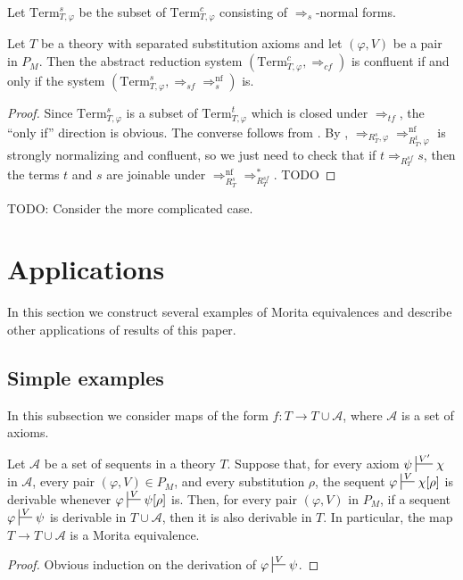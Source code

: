\documentclass[reqno]{amsart}
\theoremstyle{definition}
\theoremstyle{remark}
\newcommand{\nf}{\mathrm{nf}}
\newcommand{\Term}{\mathrm{Term}}
\numberwithin{figure}{section}
\begin{document}
Let $\Term_{T,\varphi}^s$ be the subset of $\Term_{T,\varphi}^c$ consisting of $\Rightarrow_s$-normal forms.

\begin{prop}
Let $T$ be a theory with separated substitution axioms and let $(\varphi,V)$ be a pair in $P_M$.
Then the abstract reduction system $(\Term_{T,\varphi}^c,\Rightarrow_{cf})$ is confluent if and only if the system $(\Term_{T,\varphi}^s, \Rightarrow_{sf} \Rightarrow_s^\nf)$ is.
\end{prop}
\begin{proof}
Since $\Term_{T,\varphi}^s$ is a subset of $\Term_{T,\varphi}^t$ which is closed under $\Rightarrow_{tf}$, the ``only if'' direction is obvious.
The converse follows from .
By , $\Rightarrow_{R^s_T,\varphi} \Rightarrow_{R^t_T,\varphi}^\nf$ is strongly normalizing and confluent, so we just need to check that if $t \Rightarrow_{R_T^{sf}} s$,
then the terms $t$ and $s$ are joinable under $\Rightarrow_{R_T^s}^\nf \Rightarrow_{R_T^{sf}}^*$.
TODO
\end{proof}

TODO: Consider the more complicated case.

\section{Applications}
\label{sec:applications}

In this section we construct several examples of Morita equivalences and describe other applications of results of this paper.

\subsection{Simple examples}
\label{sec:simp-applications}

In this subsection we consider maps of the form $f : T \to T \cup \mathcal{A}$, where $\mathcal{A}$ is a set of axioms.

\begin{prop}
Let $\mathcal{A}$ be a set of sequents in a theory $T$.
Suppose that, for every axiom $\psi \sststile{}{V'} \chi$ in $\mathcal{A}$, every pair $(\varphi,V) \in P_M$, and every substitution $\rho$,
the sequent $\varphi \sststile{}{V} \chi[\rho]$ is derivable whenever $\varphi \sststile{}{V} \psi[\rho]$ is.
Then, for every pair $(\varphi,V)$ in $P_M$, if a sequent $\varphi \sststile{}{V} \psi$ is derivable in $T \cup \mathcal{A}$, then it is also derivable in $T$.
In particular, the map $T \to T \cup \mathcal{A}$ is a Morita equivalence.
\end{prop}
\begin{proof}
Obvious induction on the derivation of $\varphi \sststile{}{V} \psi$.
\end{proof}
\end{document}
